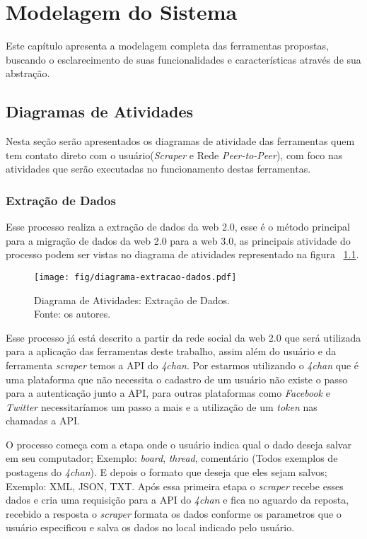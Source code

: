\chapter{Modelagem do Sistema}

Este capítulo apresenta a modelagem completa das ferramentas
propostas, buscando o esclarecimento de suas funcionalidades e características
através de sua abstração.

\section{Diagramas de Atividades}

Nesta seção serão apresentados os diagramas de atividade das ferramentas quem tem contato direto com o usuário(\textit{Scraper} e Rede \textit{Peer-to-Peer}), com foco nas atividades que serão executadas no funcionamento destas ferramentas.

\subsection{Extração de Dados\label{subsec:extracao_de_dados}}

Esse processo realiza a extração de dados da web 2.0, esse é o método principal para a migração de dados da web 2.0 para a web 3.0, as principais atividade do processo podem ser vistas no diagrama de atividades representado na figura ~\ref{fig:extracao_de_dados}.

\begin{figure}[htb]
    \centering
    \texttt{[image: fig/diagrama-extracao-dados.pdf]}
    \caption[Activity diagram: data extraction]{
        Diagrama de Atividades: Extração de Dados.\\
        Fonte: os autores.
    }
    \label{fig:extracao_de_dados}
\end{figure}

Esse processo já está descrito a partir da rede social da web 2.0 que será utilizada para a aplicação das ferramentas deste trabalho, assim além
do usuário e da ferramenta \textit{scraper} temos a API do \textit{4chan}. Por estarmos utilizando o \textit{4chan} que é uma plataforma que não necessita o cadastro de um usuário não existe o passo para a autenticação junto a API, para outras plataformas como \textit{Facebook} e \textit{Twitter} necessitaríamos um passo a mais e a utilização de um \textit{token} nas chamadas a API.

O processo começa com a etapa onde o usuário indica qual o dado deseja salvar em seu computador; Exemplo: \textit{board}, \textit{thread}, comentário (Todos exemplos de postagens do \textit{4chan}). E depois o
formato que deseja que eles sejam salvos; Exemplo: XML, JSON, TXT. Após essa primeira etapa o \textit{scraper} recebe esses dados e cria uma requisição para a API do \textit{4chan} e fica no aguardo da
reposta, recebido a resposta o \textit{scraper} formata os dados conforme os parametros que o usuário especificou e salva os dados no local indicado pelo usuário.

